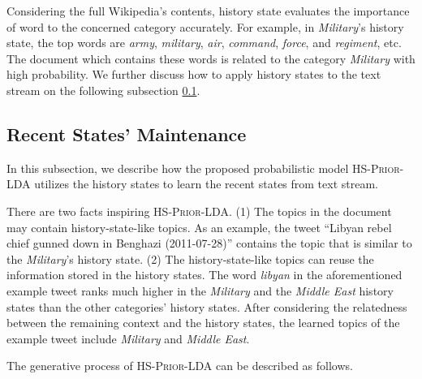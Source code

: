\documentclass[runningheads,a4paper]{llncs}
\begin{document}
Considering the full Wikipedia's contents, history state evaluates the importance of word to the concerned category accurately. 
For example, in \textit{Military}'s history state, the top  words are \textit{army}, \textit{military}, \textit{air}, \textit{command}, \textit{force}, and \textit{regiment}, etc. 
The document which contains these words is related to the category \textit{Military} with high probability. 
We further discuss how to apply history states to the text stream on the following subsection \ref{subsec:rs_initialization}.

\subsection{Recent States' Maintenance}
\label{subsec:rs_initialization}
In this subsection, we describe how the proposed probabilistic model \textsc{HS-Prior-LDA} utilizes the history states to learn the recent states from text stream.

There are two facts inspiring \textsc{HS-Prior-LDA}. 
(1) The topics in the document may contain history-state-like topics. 
As an example, the tweet ``Libyan rebel chief gunned down in Benghazi (2011-07-28)'' contains the topic that is similar to the \textit{Military}'s history state.
(2) The history-state-like topics can reuse the information  stored in the history states.
The word \textit{libyan} in the aforementioned example tweet ranks much higher in the \textit{Military} and the \textit{Middle East} history states than the other categories' history states.
After considering the relatedness between the remaining context and the history states, the learned topics of the example tweet include \textit{Military} and \textit{Middle East}. 

The generative process of \textsc{HS-Prior-LDA} can be described as follows.
\end{document}
